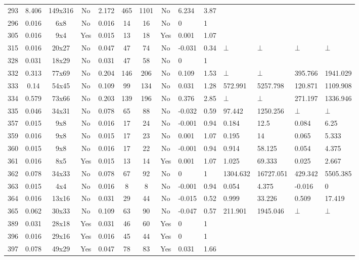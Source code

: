 \documentclass[11pt]{article}
\begin{document}
\begin{landscape}
\begin{small}
\begin{longtable}[c]{| c | c | c | c |c |c |c |c |p{1.5cm} |p{1.5cm} |p{1.5cm} |p{1.5cm} |p{1.5cm} |p{1.5cm} |}
293 & 8.406 & 149x316 & No & 2.172 & 465 & 1101 & No & 6.234 & 3.87 &  &  &  & \\
296 & 0.016 & 6x8 & No & 0.016 & 14 & 16 & No & 0 & 1 &  &  &  & \\
305 & 0.016 & 9x4 & Yes & 0.015 & 13 & 18 & Yes & 0.001 & 1.07 &  &  &  & \\
315 & 0.016 & 20x27 & No & 0.047 & 47 & 74 & No & -0.031 & 0.34 & $\bot$ & $\bot$ & $\bot$ & $\bot$\\
328 & 0.031 & 18x29 & No & 0.031 & 47 & 58 & No & 0 & 1 &  &  &  & \\
332 & 0.313 & 77x69 & No & 0.204 & 146 & 206 & No & 0.109 & 1.53 & $\bot$ & $\bot$ & 395.766 & 1941.029\\
333 & 0.14 & 54x45 & No & 0.109 & 99 & 134 & No & 0.031 & 1.28 & 572.991 & 5257.798 & 120.871 & 1109.908\\
334 & 0.579 & 73x66 & No & 0.203 & 139 & 196 & No & 0.376 & 2.85 & $\bot$ & $\bot$ & 271.197 & 1336.946\\
335 & 0.046 & 34x31 & No & 0.078 & 65 & 88 & No & -0.032 & 0.59 & 97.442 & 1250.256 & $\bot$ & $\bot$\\
357 & 0.015 & 9x8 & No & 0.016 & 17 & 24 & No & -0.001 & 0.94 & 0.184 & 12.5 & 0.084 & 6.25\\
359 & 0.016 & 9x8 & No & 0.015 & 17 & 23 & No & 0.001 & 1.07 & 0.195 & 14 & 0.065 & 5.333\\
360 & 0.015 & 9x8 & No & 0.016 & 17 & 22 & No & -0.001 & 0.94 & 0.914 & 58.125 & 0.054 & 4.375\\
361 & 0.016 & 8x5 & Yes & 0.015 & 13 & 14 & Yes & 0.001 & 1.07 & 1.025 & 69.333 & 0.025 & 2.667\\
362 & 0.078 & 34x33 & No & 0.078 & 67 & 92 & No & 0 & 1 & 1304.632 & 16727.051 & 429.342 & 5505.385\\
363 & 0.015 & 4x4 & No & 0.016 & 8 & 8 & No & -0.001 & 0.94 & 0.054 & 4.375 & -0.016 & 0\\
364 & 0.016 & 13x16 & No & 0.031 & 29 & 44 & No & -0.015 & 0.52 & 0.999 & 33.226 & 0.509 & 17.419\\
365 & 0.062 & 30x33 & No & 0.109 & 63 & 90 & No & -0.047 & 0.57 & 211.901 & 1945.046 & $\bot$ & $\bot$\\
389 & 0.031 & 28x18 & Yes & 0.031 & 46 & 60 & Yes & 0 & 1 &  &  &  & \\
396 & 0.016 & 29x16 & Yes & 0.016 & 45 & 44 & Yes & 0 & 1 &  &  &  & \\
397 & 0.078 & 49x29 & Yes & 0.047 & 78 & 83 & Yes & 0.031 & 1.66 &  &  &  & \\

\end{longtable}
\end{small}
\end{landscape}
\end{document}
